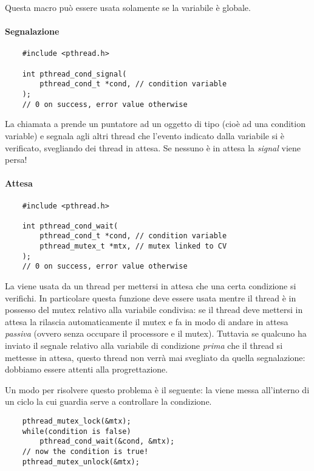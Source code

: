 Questa macro può essere usata solamente se la variabile  è globale.

\paragraph{Segnalazione}
\begin{verbatim}
    #include <pthread.h>

    int pthread_cond_signal(
        pthread_cond_t *cond, // condition variable
    );
    // 0 on success, error value otherwise
\end{verbatim}

La chiamata a  prende un puntatore ad un oggetto di tipo  (cioè ad una condition variable) e segnala agli altri thread che l'evento indicato dalla variabile  si è verificato, svegliando  dei thread in attesa. Se nessuno è in attesa la \emph{signal} viene persa!

\paragraph{Attesa}
\begin{verbatim}
    #include <pthread.h>

    int pthread_cond_wait(
        pthread_cond_t *cond, // condition variable
        pthread_mutex_t *mtx, // mutex linked to CV
    );
    // 0 on success, error value otherwise
\end{verbatim}
La  viene usata da un thread per mettersi in attesa che una certa condizione si verifichi. In particolare questa funzione deve essere usata mentre il thread è in possesso del mutex relativo alla variabile condivisa: se il thread deve mettersi in attesa la  rilascia automaticamente il mutex e fa in modo di andare in attesa \emph{passiva} (ovvero senza occupare il processore e il mutex). Tuttavia se qualcuno ha inviato il segnale relativo alla variabile di condizione \emph{prima} che il thread si mettesse in attesa, questo thread non verrà mai svegliato da quella segnalazione: dobbiamo essere attenti alla progrettazione.

Un modo per risolvere questo problema è il seguente: la  viene messa all'interno di un ciclo  la cui guardia serve a controllare la condizione. 
\begin{verbatim}
    pthread_mutex_lock(&mtx);
    while(condition is false)
        pthread_cond_wait(&cond, &mtx);
    // now the condition is true!
    pthread_mutex_unlock(&mtx);
\end{verbatim}

